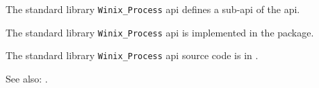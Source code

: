 

The standard library {\tt Winix\_Process} api defines a sub-api of the  api.

The standard library {\tt Winix\_Process} api is implemented in the  package.

The standard library {\tt Winix\_Process} api source code is in .

See also: .

